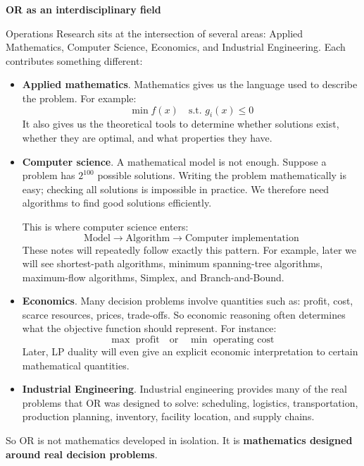 \highspace
\begin{flushleft}
    \textcolor{Green3}{ \textbf{OR as an interdisciplinary field}}
\end{flushleft}
Operations Research sits at the intersection of several areas: Applied Mathematics, Computer Science, Economics, and Industrial Engineering. Each contributes something different:
\begin{itemize}
    \item \textbf{Applied mathematics}. Mathematics gives us the language used to describe the problem. For example:
        \begin{equation*}
            \min f(x) \quad \text{s.t. } g_i(x)\leq 0
        \end{equation*}
        It also gives us the theoretical tools to determine whether solutions exist, whether they are optimal, and what properties they have.

    \item \textbf{Computer science}. A mathematical model is not enough. Suppose a problem has $2^{100}$ possible solutions. Writing the problem mathematically is easy; checking all solutions is impossible in practice. We therefore need algorithms to find good solutions efficiently.

        This is where computer science enters:
        \begin{equation*}
            \text{Model} \longrightarrow \text{Algorithm} \longrightarrow \text{Computer implementation}
        \end{equation*}
        These notes will repeatedly follow exactly this pattern. For example, later we will see shortest-path algorithms, minimum spanning-tree algorithms, maximum-flow algorithms, Simplex, and Branch-and-Bound.

    \item \textbf{Economics}. Many decision problems involve quantities such as: profit, cost, scarce resources, prices, trade-offs. So economic reasoning often determines what the objective function should represent. For instance:
        \begin{equation*}
            \max \text{ profit} \quad \text{or} \quad \min \text{ operating cost}
        \end{equation*}
        Later, LP duality will even give an explicit economic interpretation to certain mathematical quantities.

    \item \textbf{Industrial Engineering}. Industrial engineering provides many of the real problems that OR was designed to solve: scheduling, logistics, transportation, production planning, inventory, facility location, and supply chains.
\end{itemize}
So OR is not mathematics developed in isolation. It is \textbf{mathematics designed around real decision problems}.

